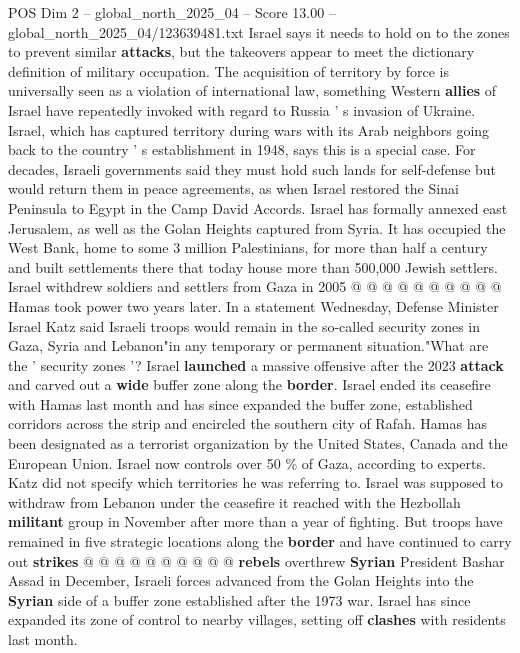 \begin{textsample}{POS Dim 2 – global\_north\_2025\_04 – Score 13.00 – global\_north\_2025\_04/123639481.txt}  \label{ex:f2_pos_429}
Israel says it needs to hold on to the zones to prevent similar \textbf{attacks}, but the takeovers appear to meet the dictionary definition of military occupation.
The acquisition of territory by force is universally seen as a violation of international law, something Western \textbf{allies} of Israel have repeatedly invoked with regard to Russia ' s invasion of Ukraine.
Israel, which has captured territory during wars with its Arab neighbors going back to the country ' s establishment in 1948, says this is a special case.
For decades, Israeli governments said they must hold such lands for self-defense but would return them in peace agreements, as when Israel restored the Sinai Peninsula to Egypt in the Camp David Accords.
Israel has formally annexed east Jerusalem, as well as the Golan Heights captured from Syria.
It has occupied the West Bank, home to some 3 million Palestinians, for more than half a century and built settlements there that today house more than 500,000 Jewish settlers.
Israel withdrew soldiers and settlers from Gaza in 2005 @ @ @ @ @ @ @ @ @ @ Hamas took power two years later.
In a statement Wednesday, Defense Minister Israel Katz said Israeli troops would remain in the so-called security zones in Gaza, Syria and Lebanon"in any temporary or permanent situation."What are the ' security zones '?
Israel \textbf{launched} a massive offensive after the 2023 \textbf{attack} and carved out a \textbf{wide} buffer zone along the \textbf{border}.
Israel ended its ceasefire with Hamas last month and has since expanded the buffer zone, established corridors across the strip and encircled the southern city of Rafah.
Hamas has been designated as a terrorist organization by the United States, Canada and the European Union.
Israel now controls over 50 \% of Gaza, according to experts.
Katz did not specify which territories he was referring to.
Israel was supposed to withdraw from Lebanon under the ceasefire it reached with the Hezbollah \textbf{militant} group in November after more than a year of fighting.
But troops have remained in five strategic locations along the \textbf{border} and have continued to carry out \textbf{strikes} @ @ @ @ @ @ @ @ @ @ \textbf{rebels} overthrew \textbf{Syrian} President Bashar Assad in December, Israeli forces advanced from the Golan Heights into the \textbf{Syrian} side of a buffer zone established after the 1973 war.
Israel has since expanded its zone of control to nearby villages, setting off \textbf{clashes} with residents last month.

\end{textsample}
